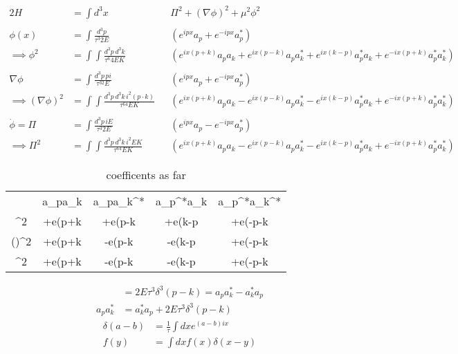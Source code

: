 \documentclass{article}
\begin{document}
\begin{align*}{2}
	H &=\int d^3x \quad &&\Pi^2 + (\nabla\phi)^2 + \mu^2\phi^2\\\\
	\phi(x) &= \int \frac{d^3p}{\tau^3 2E} &&\left(e^{ipx}a_p + e^{-ipx}a^*_p\right) \\
	\implies \phi^2 &= \int\int \frac{d^3p\, d^3k}{\tau^6 4EK} &&\left(e^{ix(p+k)}a_pa_k+e^{ix(p-k)}a_pa_k^*+e^{ix(k-p)}a_p^*a_k+e^{-ix(p+k)}a_p^*a_k^*\right)\\\\
	\nabla\phi&=\int \frac{d^3p\, p i}{\tau^32E} &&\left(e^{ipx}a_p + e^{-ipx}a^*_p\right)\\
	\implies(\nabla\phi)^2 &= \int\int \frac{d^3p\,d^3k\, i^2 (p\cdot k)}{\tau^64EK} &&\left(e^{ix(p+k)}a_pa_k-e^{ix(p-k)}a_pa_k^*-e^{ix(k-p)}a_p^*a_k+e^{-ix(p+k)}a_p^*a_k^*\right)\\\\
	\dot{\phi}=\Pi&=\int \frac{d^3p\,iE}{\tau^3 2E} &&\left(e^{ipx}a_p-e^{-ipx}a_p^*\right)\\
	\implies \Pi^2&=\int\int \frac{d^3p\,d^3k\,i^2EK}{\tau^64EK} &&\left(e^{ix(p+k)}a_pa_k-e^{ix(p-k)}a_pa_k^*-e^{ix(k-p)}a_p^*a_k+e^{-ix(p+k)}a_p^*a_k^*\right)
\end{align*}
\begin{table}[!h]
	\centering
	\caption{coefficents as far}
	\begin{tabular}{C|C|C|C|C}
		& a_pa_k & a_pa_k^* & a_p^*a_k & a_p^*a_k^*\\
		\phi^2 &+e(p+k &+e(p-k &+e(k-p &+e(-p-k\\
		(\nabla\phi)^2 &+e(p+k &-e(p-k &-e(k-p &+e(-p-k\\
		\Pi^2 &+e(p+k &-e(p-k &-e(k-p &+e(-p-k\\
	\end{tabular}
\end{table}
	\begin{align*}
		[a_p,a_k^*]&=2E\tau^3\delta^3(p-k)=a_pa_k^* - a_k^*a_p\\
		a_pa_k^*&=a_k^*a_p+2E\tau^3\delta^3(p-k)
	\end{align*}
    \begin{align*}
        \delta(a-b)&= \frac{1}{\tau} \int dx e^{(a-b)ix}\\
        f(y)&=\int dx f(x) \delta(x-y)
    \end{align*}
\pagebreak
\end{document}
